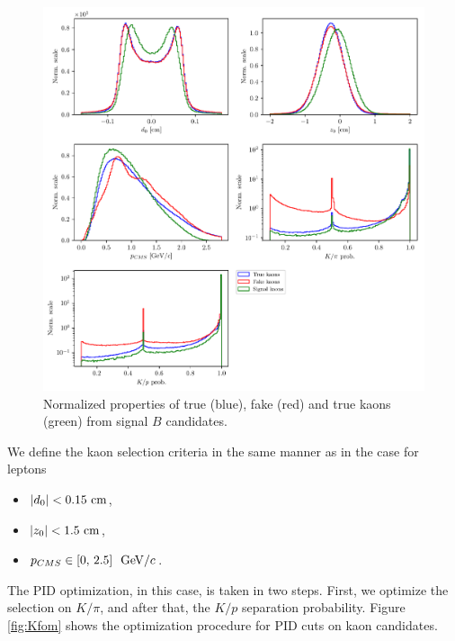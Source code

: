 \begin{figure}[H]
	\centering
	\includegraphics[width=\linewidth]{fig/FSP_kaon_vars}
	\captionsetup{width=.8\linewidth}
	\caption{Normalized properties of true (blue), fake (red) and true kaons (green) from signal $B$ candidates.}
	\label{fig:Kvars}
\end{figure}

We define the kaon selection criteria in the same manner as in the case for leptons
\begin{itemize}
	\item $\vert d_0 \vert < 0.15\mathrm{~cm}$,
	\item $\vert z_0 \vert < 1.5\mathrm{~cm}$,
	\item $p_{CMS} \in [0,\,2.5]~\mathrm{~GeV}/c$.
\end{itemize}

The PID optimization, in this case, is taken in two steps. First, we optimize the selection on $K / \pi$, and after that, the $K/p$ separation probability. Figure \ref{fig:Kfom} shows the optimization procedure for PID cuts on kaon candidates.

